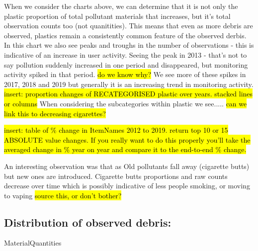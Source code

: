 \documentclass[10pt]{article}\usepackage[]{graphicx}\usepackage[]{color}
\begin{document}
When we consider the charts above, we can determine that it is not only the plastic proportion of total pollutant materials that increases, but it's total observation counts too (not quanitities). This means that even as more debris are observed, plastics remain a consistently common feature of the observed derbis.\\

In this chart we also see peaks and troughs in the number of observations - this is indicative of an increase in user activity. Seeing the peak in 2013 - that's not to say pollution suddenly increased in one period and disappeared, but monitoring activity spiked in that period. \hl{do we know why?} We see more of these spikes in 2017, 2018 and 2019 but generally it is an increasing trend in monitoring activity.\\


\hl{insert: proportion changes of RECATEGORISED plastic over years. stacked lines or columns}
When considering the subcategories within plastic we see..... \hl{can we link this to decreasing cigarettes?}

\hl{insert: table of \% change in ItemNames 2012 to 2019. return top 10 or 15 ABSOLUTE value changes. If you really want to do this properly you'll take the averaged change in \% year on year and compare it to the end-to-end \% change.}

An interesting observation was that as Old pollutants fall away (cigarette butts) but new ones are introduced. Cigarette butts proportions and raw counts decrease over time which is possibly indicative of less people smoking, or moving to vaping \hl{source this, or don't bother?}\\


\subsection {Distribution of observed debris:}

MaterialQuantities\\
\end{document}
